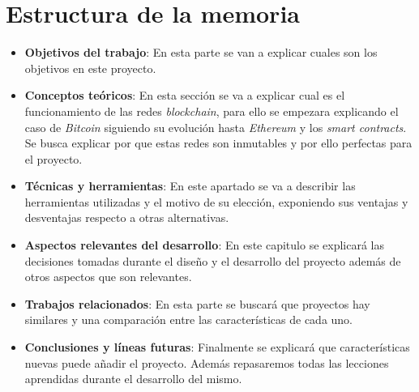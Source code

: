 \section{Estructura de la memoria}

\begin{itemize}
  \item \textbf{Objetivos del trabajo}: En esta parte se van a explicar cuales son los objetivos en este proyecto.
  \item \textbf{Conceptos teóricos}: En esta sección se va a explicar cual es el funcionamiento de las redes \textit{blockchain}, para ello se empezara explicando el caso de \textit{Bitcoin} siguiendo su evolución hasta \textit{Ethereum} y los \textit{smart contracts}. Se busca explicar por que estas redes son inmutables y por ello perfectas para el proyecto.
  \item \textbf{Técnicas y herramientas}: En este apartado se va a describir las herramientas utilizadas y el motivo de su elección, exponiendo sus ventajas y desventajas respecto a otras alternativas.
  \item \textbf{Aspectos relevantes del desarrollo}: En este capitulo se explicará las decisiones tomadas durante el diseño y el desarrollo del proyecto además de otros aspectos que son relevantes.
  \item \textbf{Trabajos relacionados}: En esta parte se buscará que proyectos hay similares y una comparación entre las características de cada uno.
  \item \textbf{Conclusiones y líneas futuras}: Finalmente se explicará que características nuevas puede añadir el proyecto. Además repasaremos todas las lecciones aprendidas durante el desarrollo del mismo.
\end{itemize}
